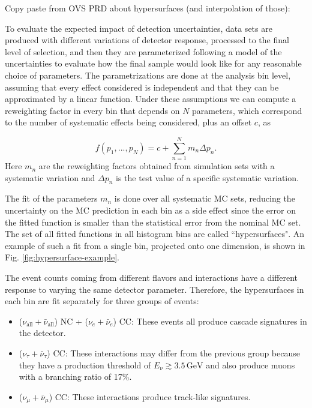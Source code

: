 

Copy paste from OVS PRD about hypersurfaces (and interpolation of those):

To evaluate the expected impact of detection uncertainties, data sets are produced with different variations of detector response, processed to the final level of selection, and then they are parameterized following a model of the uncertainties to evaluate how the final sample would look like for any reasonable choice of parameters. The parametrizations are done at the analysis bin level, assuming that every effect considered is independent and that they can be approximated by a linear function. Under these assumptions we can compute a reweighting factor in every bin that depends on $N$ parameters, which correspond to the number of systematic effects being considered, plus an offset $c$, as

\begin{equation}
    f(p_1,...,p_N)=c+\sum_{n=1}^N m_n \Delta p_n.
\end{equation}
Here $m_n$ are the reweighting factors obtained from simulation sets with a systematic variation and $\Delta p_n$ is the test value of a specific systematic variation.

The fit of the parameters $m_n$ is done over all systematic MC sets, reducing the uncertainty on the MC prediction in each bin as a side effect since the error on the fitted function is smaller than the statistical error from the nominal MC set. The set of all fitted functions in all histogram bins are called ``hypersurfaces". An example of such a fit from a single bin, projected onto one dimension, is shown in Fig. \ref{fig:hypersurface-example}. %

The event counts coming from different flavors and interactions have a different response to varying the same detector parameter. Therefore, the hypersurfaces in each bin are fit separately for three groups of events:
\begin{itemize}
    \item ($\nu_{\mathrm{all}} + \bar{\nu}_{\mathrm{all}}$) NC + ($\nu_e + \bar{\nu}_e$) CC: These events all produce cascade signatures in the detector.
    \item ($\nu_\tau + \bar{\nu}_\tau$) CC: These interactions may differ from the previous group because they have a production threshold of $E_\nu \gtrsim 3.5\,\mathrm{GeV}$ and also produce muons with a branching ratio of 17\%.
    \item ($\nu_\mu + \bar{\nu}_\mu$) CC: These interactions produce track-like signatures.
\end{itemize}

